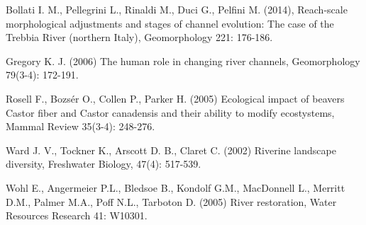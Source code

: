 {Bollati I. M., Pellegrini L., Rinaldi M., Duci G., Pelfini M. (2014), Reach-scale 
	morphological adjustments and stages of channel evolution: The case of the Trebbia 
	River (northern Italy), Geomorphology 221: 176-186. 
	
	Gregory K. J. (2006) The human role in changing river channels, Geomorphology 
	79(3-4): 172-191.
	
	Rosell F., Bozsér O., Collen P., Parker H. (2005) Ecological impact of beavers Castor 
	fiber and Castor canadensis and their ability to modify ecostystems, Mammal Review 
	35(3-4): 248-276. 
	
	Ward J. V., Tockner K., Arscott D. B., Claret C. (2002) Riverine landscape 
	diversity, Freshwater Biology, 47(4): 517-539.
	
	Wohl E., Angermeier P.L., Bledsoe B., Kondolf G.M., MacDonnell L., Merritt D.M., 
	Palmer M.A., Poff N.L., Tarboton D. (2005) River restoration, Water Resources 
	Research 41: W10301.
}%